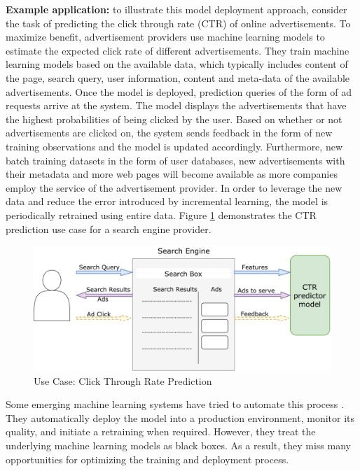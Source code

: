 \documentclass{vldb}
\begin{document}
\textbf{Example application:} to illustrate this model deployment approach, consider the task of predicting the click through rate (CTR) of online advertisements.
To maximize benefit, advertisement providers use machine learning models to estimate the expected click rate of different advertisements.
They train machine learning models based on the available data, which typically includes content of the page, search query, user information, content and meta-data of the available advertisements. 
Once the model is deployed, prediction queries of the form of ad requests arrive at the system.
The model displays the advertisements that have the highest probabilities of being clicked by the user.
Based on whether or not advertisements are clicked on, the system sends feedback in the form of new training observations and the model is updated accordingly.
Furthermore, new batch training datasets in the form of user databases, new advertisements with their metadata and more web pages will become available as more companies employ the service of the advertisement provider.
In order to leverage the new data and reduce the error introduced by incremental learning, the model is periodically retrained using entire data.
Figure \ref{fig:click-rate} demonstrates the CTR prediction use case for a search engine provider.

\begin{figure}[h]
\centering
\includegraphics[width=\columnwidth]{../images/use-case-4.pdf}
\caption{Use Case: Click Through Rate Prediction}
\label{fig:click-rate}
\end{figure}

Some emerging machine learning systems have tried to automate this process \cite{crankshaw2014missing}.
They automatically deploy the model into a production environment, monitor its quality, and initiate a retraining when required.
However, they treat the underlying machine learning models as black boxes. 
As a result, they miss many opportunities for optimizing the training and deployment process.
\end{document}
